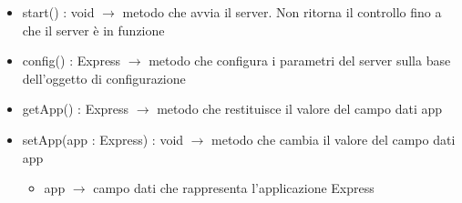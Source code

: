 \begin{description}
\begin{itemize}
	\item start() : void $\rightarrow$ metodo che avvia il server. Non ritorna il controllo fino a che il server è in funzione
	\item config() : Express $\rightarrow$ metodo che configura i parametri del server sulla base dell'oggetto di configurazione
	\item getApp() : Express $\rightarrow$ metodo che restituisce il valore del campo dati app
	\item setApp(app : Express) : void $\rightarrow$ metodo che cambia il valore del campo dati app\begin{itemize}
		\item app $\rightarrow$ campo dati che rappresenta l'applicazione Express
	\end{itemize}
	
\end{itemize}

\end{description}

\vspace{0.5cm}
\hypertarget{server::app::Configuration}{}
